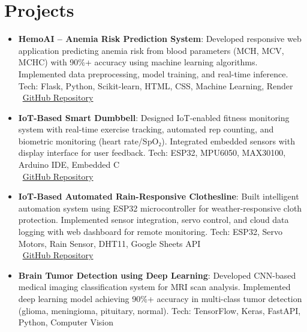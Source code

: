 \documentclass[a4paper,20pt]{article}
\newcommand{\resumeItem}[2]{
  \item\small{
    \textbf{#1}{: #2 \vspace{-2pt}}
  }
}
\newcommand{\resumeSubItem}[2]{\resumeItem{#1}{#2}\vspace{-3pt}}
\newcommand{\resumeSubHeadingListStart}{\begin{itemize}[leftmargin=*]}
\newcommand{\resumeSubHeadingListEnd}{\end{itemize}}
\begin{document}
\section{Projects}
\resumeSubHeadingListStart
\resumeSubItem{HemoAI – Anemia Risk Prediction System}
{Developed responsive web application predicting anemia risk from blood parameters (MCH, MCV, MCHC) with 90\%+ accuracy using machine learning algorithms. Implemented data preprocessing, model training, and real-time inference. Tech: Flask, Python, Scikit-learn, HTML, CSS, Machine Learning, Render\\
\faGithub~\href{https://github.com/JusCookin/HemoAI}{\underline{GitHub Repository}}}
\vspace{2pt}
\resumeSubItem{IoT-Based Smart Dumbbell}{Designed IoT-enabled fitness monitoring system with real-time exercise tracking, automated rep counting, and biometric monitoring (heart rate/SpO₂). Integrated embedded sensors with display interface for user feedback. Tech: ESP32, MPU6050, MAX30100, Arduino IDE, Embedded C\\
\faGithub~\href{https://github.com/JusCookin/IoT-Based-Smart-Dumbell}{\underline{GitHub Repository}}}
\vspace{2pt}
\resumeSubItem{IoT-Based Automated Rain-Responsive Clothesline}{Built intelligent automation system using ESP32 microcontroller for weather-responsive cloth protection. Implemented sensor integration, servo control, and cloud data logging with web dashboard for remote monitoring. Tech: ESP32, Servo Motors, Rain Sensor, DHT11, Google Sheets API\\
\faGithub~\href{https://github.com/JusCookin/IoT-Based-Automated-Rain-Responsive-Clothesline}{\underline{GitHub Repository}}}
\vspace{2pt}
\resumeSubItem{Brain Tumor Detection using Deep Learning}{Developed CNN-based medical imaging classification system for MRI scan analysis. Implemented deep learning model achieving 90\%+ accuracy in multi-class tumor detection (glioma, meningioma, pituitary, normal). Tech: TensorFlow, Keras, FastAPI, Python, Computer Vision}
\resumeSubHeadingListEnd
\vspace{-5pt}
\end{document}
